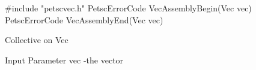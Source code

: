 #include "petscvec.h"
PetscErrorCode  VecAssemblyBegin(Vec vec)
PetscErrorCode  VecAssemblyEnd(Vec vec)

Collective on Vec

Input Parameter
vec -the vector

